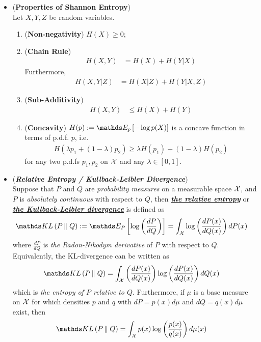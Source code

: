 \documentclass[11pt]{article}
\begin{document}
\begin{itemize}
\item \begin{proposition}(\textbf{Properties of Shannon Entropy})  \citep{thomas2006elements}\\
Let $X, Y, Z$ be random variables. 
\begin{enumerate}
\item (\textbf{Non-negativity}) $H(X) \ge 0$;
\item (\textbf{Chain Rule}) 
\begin{align*}
H(X, Y) &= H(X) + H(Y | X)
\end{align*} Furthermore, 
\begin{align*}
H(X, Y | Z) &= H(X | Z) + H(Y | X, Z)
\end{align*}
\item (\textbf{Sub-Additivity}) 
\begin{align*}
H(X, Y) &\le H(X) + H(Y)
\end{align*}
\item (\textbf{Concavity}) $H(p) := \E{p}{-\log p(X)}$ is a concave function in terms of p.d.f. $p$, i.e.
\begin{align*}
H(\lambda p_1 + (1- \lambda) p_2) \ge \lambda H(p_1) + (1- \lambda) H(p_2)
\end{align*} for any two p.d.fs $p_1, p_2$ on ${\mathcal X}$ and any $\lambda \in [0,1]$.
\end{enumerate}
\end{proposition}

\item \begin{definition} (\textbf{\emph{Relative Entropy / Kullback-Leibler Divergence}}) \citep{thomas2006elements}\\
Suppose that $P$ and $Q$ are \emph{probability measures} on a measurable space ${\mathcal X}$, and $P$ is \emph{absolutely continuous} with respect to $Q$, then \underline{\emph{\textbf{the relative entropy}}} or \underline{\emph{\textbf{the Kullback-Leibler divergence}}} is defined as
\begin{align*}
\kl{P}{Q} &:=\E{P}{\log\paren{\frac{dP}{dQ}}} = \int_{\cX} \log\paren{\frac{dP(x)}{dQ(x)}} dP(x)
\end{align*} where $\frac{dP}{dQ}$ is \emph{the Radon-Nikodym derivative} of $P$ with respect to $Q$. Equivalently, the KL-divergence can be written as
\begin{align*}
\kl{P}{Q} &= \int_{\cX} \paren{\frac{dP(x)}{dQ(x)}} \log\paren{\frac{dP(x)}{dQ(x)}} dQ(x) 
\end{align*} which is \emph{the entropy of $P$ relative to $Q$}. Furthermore, if $\mu$ is a base measure on ${\mathcal X}$ for which densities $p$ and $q$ with $dP = p(x)d\mu$ and $dQ = q(x) d\mu$ exist, then 
\begin{align*}
\kl{P}{Q} &= \int_{\cX} p(x)\log\paren{\frac{p(x)}{q(x)}} d\mu(x)
\end{align*}
\end{definition}


\end{itemize}
\end{document}
